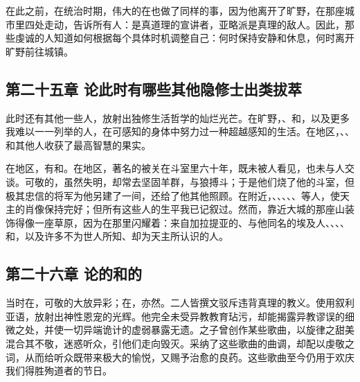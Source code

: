 在此之前，在统治时期，伟大的在也做了同样的事，因为他离开了旷野，在那座城市里四处走动，告诉所有人：是真道理的宣讲者，亚略派是真理的敌人。因此，那些虔诚的人知道如何根据每个具体时机调整自己：何时保持安静和休息，何时离开旷野前往城镇。\par


\subsection{第二十五章 论此时有哪些其他隐修士出类拔萃}

此时还有其他一些人，放射出独修生活哲学的灿烂光芒。在旷野，、和，以及更多我难以一一列举的人，在可感知的身体中努力过一种超越感知的生活。在地区，、、和其他人收获了最高智慧的果实。\par

在地区，有和。在地区，著名的被关在斗室里六十年，既未被人看见，也未与人交谈。可敬的，虽然失明，却常去坚固羊群，与狼搏斗；于是他们烧了他的斗室，但极其忠信的将军为他另建了一间，还给了他其他照顾。在附近，、、、、、等人，使天主的肖像保持完好；但所有这些人的生平我已记叙过。然而，靠近大城的那座山装饰得像一座草原，因为在那里闪耀着：来自加拉提亚的、与他同名的埃及人、、、、和，以及许多不为世人所知、却为天主所认识的人。\par


\subsection{第二十六章 论的和的}

当时在，可敬的大放异彩；在，亦然。二人皆撰文驳斥违背真理的教义。使用叙利亚语，放射出神性恩宠的光辉。他完全未受异教教育玷污，却能揭露异教谬误的细微之处，并使一切异端诡计的虚弱暴露无遗。之子曾创作某些歌曲，以旋律之甜美混合其不敬，迷惑听众，引他们走向毁灭。采纳了这些歌曲的曲调，却配以虔敬之词，从而给听众既带来极大的愉悦，又赐予治愈的良药。这些歌曲至今仍用于欢庆我们得胜殉道者的节日。\par

